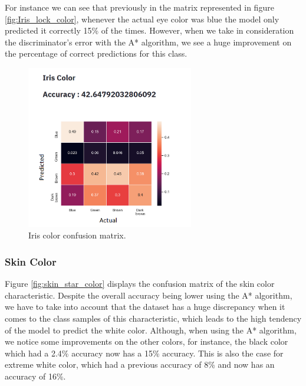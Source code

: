 \documentclass[12pt,a4paper,oneside]{memoir}
\begin{document}
\par

For instance we can see that previously in the matrix represented in figure \ref{fig:Iris_lock_color}, whenever the actual eye color was blue the model only predicted it correctly 15\% of the times. However, when we take in consideration the discriminator's error with the A* algorithm, we see a huge improvement on the percentage of correct predictions for this class.


\begin{figure}[H]
\centering
\includegraphics[width=0.65\textwidth]{images/iris_star_color.png}
\caption{Iris color confusion matrix.}
\centering
\label{fig:iris_star_color}
\end{figure}


\subsubsection{Skin Color}
Figure \ref{fig:skin_star_color} displays the confusion matrix of the skin color characteristic. Despite the overall accuracy being lower using the A* algorithm, we have to take into account that the dataset has a huge discrepancy when it comes to the class samples of this characteristic, which leads to the high tendency of the model to predict the white color. Although, when using the A* algorithm, we notice some improvements on the other colors, for instance, the black color which had a 2.4\% accuracy now has a 15\% accuracy. This is also the case for extreme white color, which had a previous accuracy of 8\% and now has an accuracy of 16\%.  
\end{document}
